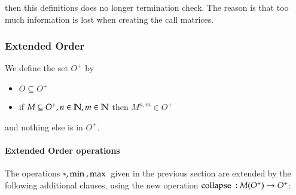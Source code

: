 then this definitions does no longer termination check.
The reason is that too much information is lost when creating the call matrices.

\newcommand{\coll}{\mathrm{collapse}\:}

\subsubsection{Extended Order}
We define the set $O^{+}$ by   
\begin{itemize}
\item
$ O \subseteq O^{+}$
\item
if $ M \subseteq O^{+} , n \in \mathbb{N} , m \in \mathbb{N} $ then $M^{n,m} \in O^{+}$
\end{itemize}
and nothing else is in $O^{+}$.

\paragraph{Extended Order operations}
The operations $ *, \mathrm{min}\: , \mathrm{max}\: $ given in the previous section are extended by the following additional clauses, using the new operation $\coll : M(O^{+}) \ra O^{+} $:

